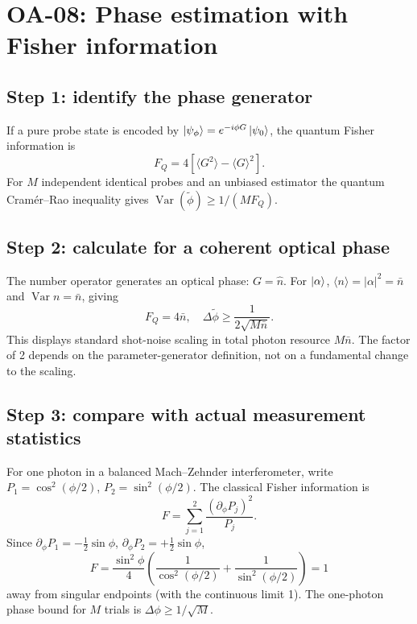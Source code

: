 
\section{OA-08: Phase estimation with Fisher information}
\subsection*{Step 1: identify the phase generator}
If a pure probe state is encoded by
\(\left\lvert \psi_\phi\right\rangle=e^{-i\phi G}\left\lvert \psi_0\right\rangle\),
the quantum Fisher information is
\[
\boxed{F_Q=4[\langle G^2\rangle-\langle G\rangle^2]}.
\]
For \(M\) independent identical probes and an unbiased
estimator the quantum Cram\'er--Rao inequality gives
\(\operatorname{Var}(\tilde\phi)\ge1/(MF_Q)\).

\subsection*{Step 2: calculate for a coherent optical phase}
The number operator generates an optical phase:
\(G=\hat n\). For \(\left\lvert \alpha\right\rangle\),
\(\langle n\rangle=|\alpha|^2=\bar n\) and
\(\operatorname{Var}n=\bar n\), giving
\[
\boxed{F_Q=4\bar n,\quad
\Delta\tilde\phi\ge\frac1{2\sqrt{M\bar n}}}.
\]
This displays standard shot-noise scaling in total photon
resource \(M\bar n\). The factor of 2 depends on the
parameter-generator definition, not on a fundamental
change to the scaling.

\subsection*{Step 3: compare with actual measurement statistics}
For one photon in a balanced Mach--Zehnder interferometer,
write \(P_1=\cos^2(\phi/2)\),
\(P_2=\sin^2(\phi/2)\). The classical Fisher information is
\[
F=\sum_{j=1}^2\frac{(\partial_\phi P_j)^2}{P_j}.
\]
Since \(\partial_\phi P_1=-\tfrac12\sin\phi\),
\(\partial_\phi P_2=+\tfrac12\sin\phi\),
\[
F=\frac{\sin^2\phi}{4}
\left(\frac1{\cos^2(\phi/2)}+
\frac1{\sin^2(\phi/2)}\right)=\boxed{1}
\]
away from singular endpoints (with the continuous limit 1).
The one-photon phase bound for \(M\) trials is
\(\Delta\phi\ge1/\sqrt M\).
